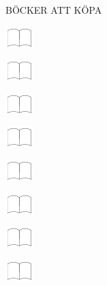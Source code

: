 \documentclass[11pt,titlepage]{article}
\begin{document}
\pagebreak

\small %
\hfill BÖCKER ATT KÖPA

\vspace{6mm}

\noindent
\includegraphics[]{book.pdf}

\vspace{12mm}

\noindent
\includegraphics[]{book.pdf}

\vspace{12mm}

\noindent
\includegraphics[]{book.pdf}

\vspace{12mm}

\noindent
\includegraphics[]{book.pdf}

\vspace{12mm}

\noindent
\includegraphics[]{book.pdf}

\vspace{12mm}

\noindent
\includegraphics[]{book.pdf}

\vspace{12mm}

\noindent
\includegraphics[]{book.pdf}

\vspace{12mm}

\noindent
\includegraphics[]{book.pdf}
\end{document}
